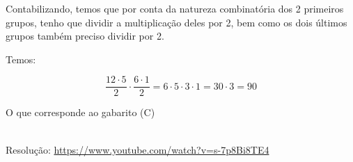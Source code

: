 Contabilizando, temos que por conta da natureza combinatória dos 2 primeiros grupos, tenho que dividir a multiplicação deles por 2, bem como os dois últimos grupos também preciso dividir por 2.

Temos:

\[
\dfrac{12 \cdot 5}{2} \cdot \dfrac{6 \cdot 1}{2} = 6 \cdot 5 \cdot 3 \cdot 1 = 30 \cdot 3 = 90
\]

O que corresponde ao gabarito (C)

\begin{center}
    \href{https://www.youtube.com/watch?v=s-7p8Bi8TE4}{
    }\\
    Resolução: \url{https://www.youtube.com/watch?v=s-7p8Bi8TE4}
\end{center}
